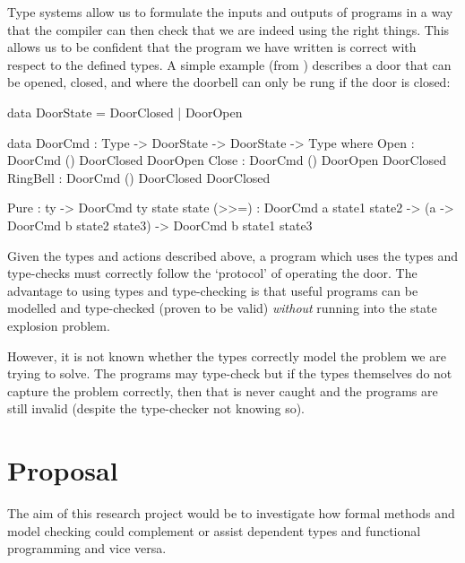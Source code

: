 \documentclass[11pt]{article}
\begin{document}
    Type systems allow us to formulate the inputs and outputs of programs in a
    way that the compiler can then check that we are indeed using the right
    things. This allows us to be confident that the program we have written is
    correct with respect to the defined types. A simple example (from
    \cite{brady_type-driven_2017}) describes a door that can be opened, closed,
    and where the doorbell can only be rung if the door is closed:
    \begin{idrislisting}
data DoorState = DoorClosed | DoorOpen

data DoorCmd : Type -> DoorState -> DoorState -> Type
  where
    Open : DoorCmd     () DoorClosed DoorOpen
    Close : DoorCmd    () DoorOpen DoorClosed
    RingBell : DoorCmd () DoorClosed DoorClosed
    
    Pure : ty -> DoorCmd ty state state
    (>>=) : DoorCmd a state1 state2 ->
            (a -> DoorCmd b state2 state3) ->
            DoorCmd b state1 state3
    \end{idrislisting}
    Given the types and actions described above, a program which uses the types
    and type-checks must correctly follow the `protocol' of operating the door.
    The advantage to using types and type-checking is that useful programs can
    be modelled and type-checked (proven to be valid) \textit{without}
    running into the state explosion problem.
    
    However, it is not known whether the types correctly model the problem we
    are trying to solve. The programs may type-check but if the types themselves
    do not capture the problem correctly, then that is never caught and the
    programs are still invalid (despite the type-checker not knowing so).
    
    \section*{Proposal}
    The aim of this research project would be to investigate how formal methods
    and model checking could complement or assist dependent types and
    functional programming and vice versa.
    
\end{document}

